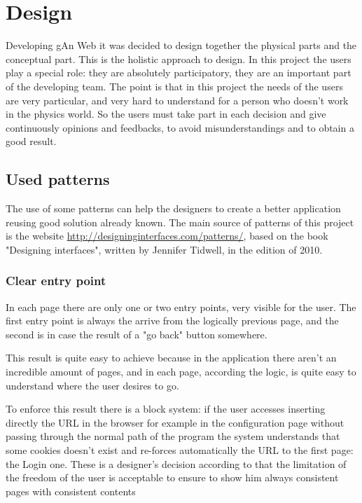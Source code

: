
\chapter{Design} %

\label{Chapter7} %

Developing gAn Web it was decided to design together the physical parts and the conceptual part. This is the holistic approach to design. In this project the users play a special role: they are absolutely participatory, they are an important part of the developing team.
The point is that in this project the needs of the users are very particular, and very hard to understand for a person who doesn't work in the physics world. So the users must take part in each decision and give continuously opinions and feedbacks, to avoid misunderstandings and to obtain a good result.

\section{Used patterns}

The use of some patterns can help the designers to create a better application reusing good solution already known.
The main source of patterns of this project is the website \url{http://designinginterfaces.com/patterns/}, based on the book "Designing interfaces", written by Jennifer Tidwell, in the edition of 2010.

\subsection{Clear entry point} 

In each page there are only one or two entry points, very visible for the user.
The first entry point is always the arrive from the logically previous page, and the second is in case the result of a "go back" button somewhere.

This result is quite easy to achieve because in the application there aren't an incredible amount of pages, and in each page, according the logic, is quite easy to understand where the user desires to go. 

To enforce this result there is a block system: if the user accesses inserting directly the URL in the browser for example in the configuration page without passing through the normal path of the program the system understands that some cookies doesn't exist and re-forces automatically the URL to the first page: the Login one. These is a designer's decision according to that the limitation of the freedom of the user is acceptable to ensure to show him always consistent pages with consistent contents

